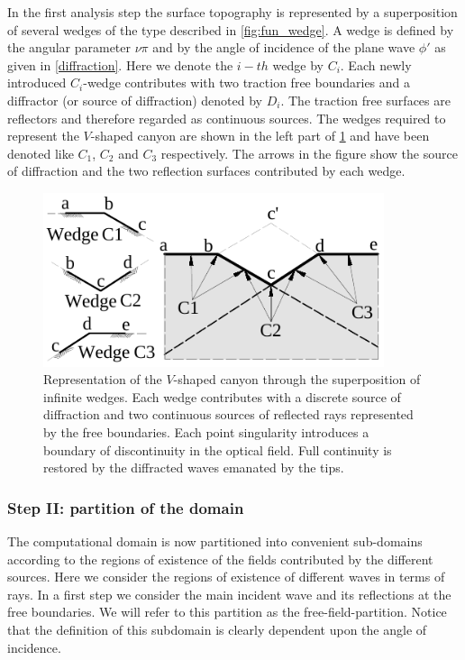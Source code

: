 \documentclass[11pt,letterpaper]{article}
\begin{document}
In the first analysis step the surface topography is represented by a superposition of several wedges of the type described in \cref{fig:fun_wedge}. A wedge is defined by the angular parameter $\nu \pi$ and by the angle of incidence of the plane wave $\phi'$ as given in \cref{diffraction}. Here we denote the $i-th$ wedge by $C_i$. Each newly introduced $C_i$-wedge contributes with two traction free boundaries and a diffractor (or source of diffraction) denoted by $D_i$. The traction free surfaces are reflectors and therefore regarded as continuous sources. The wedges required to represent the $V$-shaped canyon are shown in the left part of \cref{fig:wedges} and have been denoted like $C_1$, $C_2$ and $C_3$ respectively. The arrows in the figure show the source of diffraction and the two reflection surfaces contributed by each wedge.

\begin{figure}[H]
\centering
\includegraphics[width=10cm]{IMAGES/vshapedw.pdf}
\caption{Representation of the $V$-shaped canyon through the superposition of infinite wedges. Each wedge contributes with a discrete source of diffraction and two continuous sources of reflected rays represented by the free boundaries. Each point singularity introduces a boundary of discontinuity in the optical field. Full continuity is restored by the  diffracted waves emanated by the tips.
\label{fig:wedges}}
\end{figure}

\subsubsection*{Step II: partition of the domain}

The computational domain is now partitioned into convenient sub-domains according to the regions of existence of the fields contributed by the different sources. Here we consider the regions of existence of different waves in terms of rays. In a first step we consider the main incident wave and its reflections at the free boundaries. We will refer to this partition as the free-field-partition. Notice that the definition of this subdomain is clearly dependent upon the angle of incidence.
\end{document}
